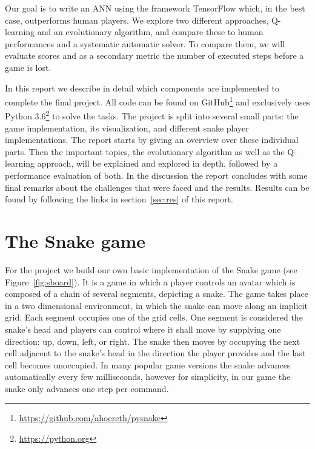 \documentclass[a4paper]{article}
\def\repository{https://github.com/ahoereth/pysnake}
\begin{document}
Our goal is to write an ANN using the framework TensorFlow\cite{tensorflow2015} which, in the best case, outperforms human players. We explore two different approaches, Q-learning and an evolutionary algorithm, and compare these to human performances and a systematic automatic solver. To compare them, we will evaluate scores and as a secondary metric the number of executed steps before a game is lost. 

In this report we describe in detail which components are implemented to
complete the final project. All code can be found on
GitHub\footnote{\url{\repository}} and exclusively
uses Python 3.6\footnote{\url{https://python.org}} to solve the tasks. The project is split into several small parts: the game implementation, its visualization, and different snake player implementations. The report starts by giving an overview over these individual parts. Then the important topics, the evolutionary algorithm as well as the Q-learning approach, will be explained and explored in depth, followed by a performance
evaluation of both. In the discussion the report concludes with some final remarks about the challenges that were faced and the results. Results can be found by following the links in section~\ref{sec:res} of this report.


\section{The Snake game}
For the project we build our own basic implementation of the Snake game (see Figure~\ref{fig:sboard}). It is a game in which a player controls an avatar which is composed of a chain of several segments, depicting a snake. The game takes place in a two dimensional environment, in which the snake can move along an implicit grid. Each segment occupies one of the grid cells. One segment is considered the snake's head and players can control where it shall move by supplying one direction: up, down, left, or right. The snake then moves by occupying the next cell adjacent to the snake's head in the direction the player provides and the last cell becomes unoccupied. In many popular game versions the snake advances automatically every few milliseconds, however for simplicity, in our game the snake only advances one step per command.
\end{document}
